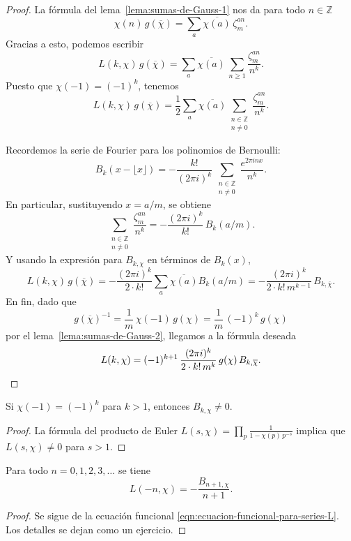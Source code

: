 \begin{proof}
  La fórmula del lema~\ref{lema:sumas-de-Gauss-1} nos da para todo
  $n \in \mathbb{Z}$
  \[ \chi (n)\,g (\overline{\chi}) =
     \sum_a \overline{\chi (a)}\,\zeta^{an}_m. \]
  Gracias a esto, podemos escribir
  \[ L (k,\chi)\,g (\overline{\chi}) =
     \sum_a \overline{\chi (a)} \, \sum_{n\ge 1} \frac{\zeta_m^{an}}{n^k}. \]
  Puesto que $\chi (-1) = (-1)^k$, tenemos
  \[ L (k,\chi)\,g (\overline{\chi}) =
     \frac{1}{2} \sum_a \overline{\chi (a)} \sum_{\substack{n \in \mathbb{Z} \\ n \ne 0}} \frac{\zeta_m^{an}}{n^k}. \]

  Recordemos la serie de Fourier para los polinomios de Bernoulli:
  \[ B_k (x - \lfloor x\rfloor) =
     -\frac{k!}{(2\pi i)^k} \, \sum_{\substack{n \in \mathbb{Z} \\ n \ne 0}} \frac{e^{2\pi i n x}}{n^k}. \]
  En particular, sustituyendo $x = a/m$, se obtiene
  \[ \sum_{\substack{n \in \mathbb{Z} \\ n \ne 0}} \frac{\zeta_m^{an}}{n^k} =
     -\frac{(2\pi i)^k}{k!}\,B_k (a/m). \]
  Y usando la expresión para $B_{k,\chi}$ en términos de $B_k (x)$,
  \[ L (k,\chi)\,g (\overline{\chi}) =
     -\frac{(2\pi i)^k}{2\cdot k!} \sum_a \overline{\chi (a)} B_k (a/m) =
     -\frac{(2\pi i)^k}{2\cdot k!\,m^{k-1}}\,B_{k,\overline{\chi}}. \]
  En fin, dado que
  \[ g (\overline{\chi})^{-1} =
     \frac{1}{m}\,\chi (-1)\,g (\chi) =
     \frac{1}{m}\,(-1)^k\,g (\chi) \]
  por el lema~\ref{lema:sumas-de-Gauss-2}, llegamos a la fórmula deseada
  \[ L (k,\chi) = (-1)^{k+1}\,\frac{(2\pi i)^k}{2\cdot k!\,m^k}\,g (\chi)\,B_{k,\overline{\chi}}. \qedhere \]
\end{proof}

\begin{corolario}
  \label{cor:no-anulacion-de-B-k-chi}
  Si $\chi (-1) = (-1)^k$ para $k > 1$, entonces $B_{k,\chi} \ne 0$.

  \begin{proof}
    La fórmula del producto de Euler
    $L (s,\chi) = \prod_p \frac{1}{1 - \chi (p)\,p^{-s}}$
    implica que $L (s,\chi) \ne 0$ para ${s > 1}$.
  \end{proof}
\end{corolario}

\begin{corolario}
  \label{cor:valores-negativos-de-series-L}
  Para todo $n = 0,1,2,3,\ldots$ se tiene
  $$L (-n,\chi) = -\frac{B_{n+1,\chi}}{n+1}.$$

  \begin{proof}
    Se sigue de la ecuación funcional
    \eqref{eqn:ecuacion-funcional-para-series-L}. Los detalles se dejan como un
    ejercicio.
  \end{proof}
\end{corolario}

